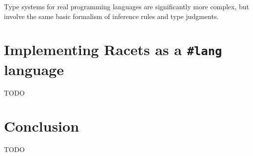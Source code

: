 \documentclass{article}
\begin{document}
Type systems for real programming languages are significantly more complex, but involve the same basic formalism of inference rules and type judgments.

\section{Implementing Racets as a \texttt{\#lang} language}
TODO

\section{Conclusion}
TODO

\begin{comment}
\section{Research plan}
My research will proceed in two directions: abstract interpretation and type theory. On the abstract interpretation side of things, it will involve writing several substantial example programs that use faceted execution, for example a grade server in which professors, teacher's assistants, and students all have different levels of access to the grade data, protected by facets. Once I have written these programs in \textsc{Racets}, I will translate them into the language of the abstract interpreter, and assess what conclusions it is able to draw about them, and to what level of precision. For example, if a certain function is sometimes applied to faceted values and sometimes applied to regular values, the abstract interpreter may or may not be able to identify the call sites that require special handling of the faceted execution, and those that can be run normally. In general, the more fine-grained the conclusions the abstract interpreter can draw, the greater the improvement of performance time.

The other part of my research will consist in writing a formal type system for the \textsc{Racets} programming language. As noted in section \ref{sec:facets}, correct use of faceted execution requires that the programmer take care to always match a faceted value with its corresponding policy in calls to \texttt{obs}. A type system that could determine whether a policy corresponds with a facet or not would be able to statically prove whether any call to \texttt{obs} results in a grounded (i.e., non-faceted) value or not---a useful result for checking the correctness of the program.

\textsc{Racets} is a dynamically-typed language (as is its base language, Racket), so any type system that I develop would take the form of a mathematical formalism rather than a concrete implementation, though an actual implementation of it would be possible using Typed Racket, a statically typed variant of Racket \cite{typed-racket}.

My research will aid in understanding the efficacy of static analysis and type theory as applied to faceted execution, and thus contribute to improving the programming-language resources that software developers have available to correctly and reliably enforce privacy policies.

\end{comment}


\end{document}
